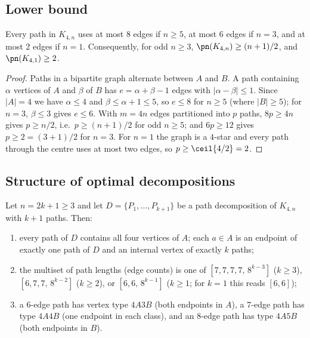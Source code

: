 \subsection{Lower bound}

\begin{lemma}\label{lem:cap}
Every path in $K_{4,n}$ uses at most $8$ edges if $n\ge5$, at most $6$ edges if $n=3$, and at
most $2$ edges if $n=1$. Consequently, for odd $n\ge3$,
$\pn(K_{4,n})\ge(n+1)/2$, and $\pn(K_{4,1})\ge2$.
\end{lemma}

\begin{proof}
Paths in a bipartite graph alternate between $A$ and $B$. A path containing $\alpha$
vertices of $A$ and $\beta$ of $B$ has $e=\alpha+\beta-1$ edges with $|\alpha-\beta|\le1$.
Since $|A|=4$ we have $\alpha\le4$ and $\beta\le\alpha+1\le5$, so $e\le8$ for $n\ge5$ (where
$|B|\ge5$); for $n=3$, $\beta\le3$ gives $e\le6$. With $m=4n$ edges partitioned into $p$ paths,
$8p\ge4n$ gives $p\ge n/2$, i.e.\ $p\ge(n+1)/2$ for odd $n\ge5$; and $6p\ge12$ gives
$p\ge2=(3+1)/2$ for $n=3$. For $n=1$ the graph is a $4$-star and every path through the centre
uses at most two edges, so $p\ge\ceil{4/2}=2$.
\end{proof}

\subsection{Structure of optimal decompositions}

\begin{theorem}\label{thm:k4struct}
Let $n=2k+1\ge3$ and let $D=\{P_1,\dots,P_{k+1}\}$ be a path decomposition of $K_{4,n}$ with
$k+1$ paths. Then:
\begin{enumerate}[label={\rm(\arabic*)},leftmargin=2em]
\item every path of $D$ contains all four vertices of $A$; each $a\in A$ is an endpoint of
exactly one path of $D$ and an internal vertex of exactly $k$ paths;
\item the multiset of path lengths (edge counts) is one of
$[7,7,7,7,\,8^{k-3}]$ ($k\ge3$), $[6,7,7,\,8^{k-2}]$ ($k\ge2$), or $[6,6,\,8^{k-1}]$
($k\ge1$; for $k=1$ this reads $[6,6]$);
\item a $6$-edge path has vertex type $4A3B$ (both endpoints in $A$), a $7$-edge path has type
$4A4B$ (one endpoint in each class), and an $8$-edge path has type $4A5B$ (both endpoints in
$B$).
\end{enumerate}
\end{theorem}

